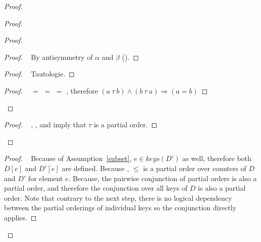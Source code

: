 \documentclass[11pt, oneside]{article}   	%
\begin{document}
\begin{proof}
\begin{proof}
\begin{proof}
				\begin{proof}
					\pf~ By antisymmetry of $\alpha$ and $\beta$ ().
				\end{proof}
				
				\begin{proof}
					\pf~ Tautologie.
				\end{proof}
				
				\qedstep
				\begin{proof}
					\pf~   $=$  $=$  $=$ , therefore $(a ~\tau~ b) \wedge (b ~\tau~ a) \Rightarrow  (a=b)$
				\end{proof}
			\end{proof}
			
			\qedstep
			\begin{proof}
				\pf~ , , and  imply that $\tau$ is a partial order.
			\end{proof}
		\end{proof}
			
			\begin{proof}
				\pf~ Because of Assumption~\ref{subset}, $e \in \textit{keys}(D')$ as well, therefore both $D[e]$ and $D'[e]$ are defined. Because , $\leq$ is a partial order over counters of $D$ and $D'$ for element $e$. Because,  the pairwise conjunction of partial orders is also a partial order, and therefore the conjunction over all keys of $D$ is also a partial order. Note that contrary to the next step, there is no logical dependency between the partial orderings of individual keys so the conjunction directly applies.
			\end{proof}
			

\end{proof}
\end{document}
